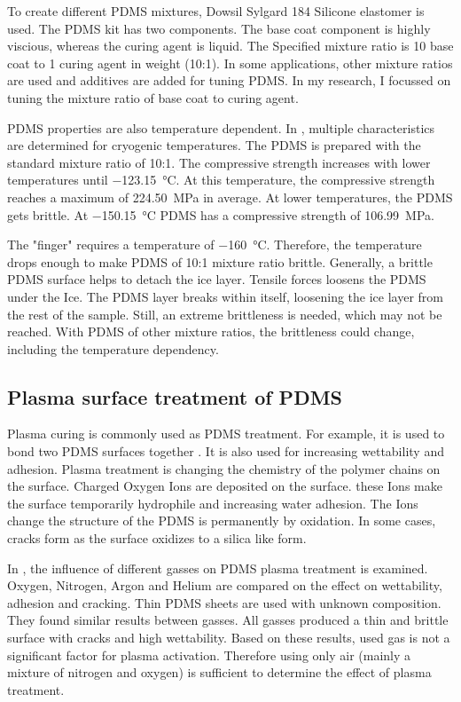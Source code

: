 To create different PDMS mixtures, Dowsil Sylgard 184 Silicone elastomer is used\cite{DOW.}. The PDMS kit has two components. The base coat component is highly viscious, whereas the curing agent is liquid. The Specified mixture ratio is 10 base coat to 1 curing agent in weight (10:1). In some applications, other mixture ratios are used and additives are added for tuning PDMS. In my research, I focussed on tuning the mixture ratio of base coat to curing agent. 

PDMS properties are also temperature dependent. In \cite{Zhang.2020}, multiple characteristics are determined for cryogenic temperatures. The PDMS is prepared with the standard mixture ratio of 10:1. The compressive strength increases with lower temperatures until \SI{-123.15}{\degreeCelsius}. At this temperature, the compressive strength reaches a maximum of \SI{224.50}{\mega\pascal} in average. At lower temperatures, the PDMS gets brittle. At \SI{-150.15}{\degreeCelsius} PDMS has a compressive strength of \SI{106.99}{\mega\pascal}.

The "finger" requires a temperature of \SI{-160}{\degreeCelsius}. Therefore, the temperature drops enough to make PDMS of 10:1 mixture ratio brittle. Generally, a brittle PDMS surface helps to detach the ice layer. Tensile forces loosens the PDMS under the Ice. The PDMS layer breaks within itself, loosening the ice layer from the rest of the sample. Still, an extreme brittleness is needed, which may not be reached. With PDMS of other mixture ratios, the brittleness could change, including the temperature dependency.

\subsection{Plasma surface treatment of PDMS}

Plasma curing is commonly used as PDMS treatment. For example, it is used to bond two PDMS surfaces together \cite{Borok.2021}. It is also used for increasing wettability and adhesion. Plasma treatment is changing the chemistry of the polymer chains on the surface. Charged Oxygen Ions are deposited on the surface. these Ions make the surface temporarily hydrophile and increasing water adhesion. The Ions change the structure of the PDMS is permanently by oxidation. In some cases, cracks form as the surface oxidizes to a silica like form.

In \cite{Owen.1994}, the influence of different gasses on PDMS plasma treatment is examined. Oxygen, Nitrogen, Argon and Helium are compared on the effect on wettability, adhesion and cracking. Thin PDMS sheets are used with unknown composition. They found similar results between gasses. All gasses produced a thin and brittle surface with cracks and high wettability. Based on these results, used gas is not a significant factor for plasma activation. Therefore using only air (mainly a mixture of nitrogen and oxygen) is sufficient to determine the effect of plasma treatment.

